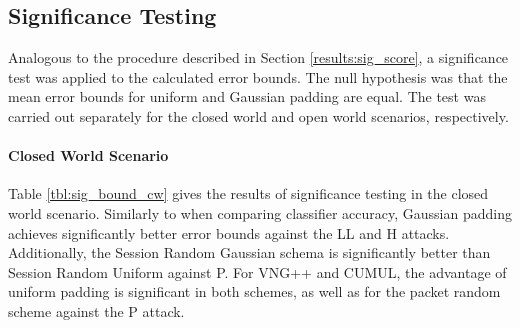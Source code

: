 \documentclass[
	ruledheaders=chapter,
	class=report,
	thesis={type=master, department=inf},
	accentcolor=1c,
	custommargins=true,
	marginpar=false,
	parskip=half-,
	fontsize=11pt,
]{tudapub}
\begin{document}
	\subsection{Significance Testing}
	
	Analogous to the procedure described in Section \ref{results:sig_score}, a significance test was applied to the calculated error bounds. The null hypothesis was that the mean error bounds for uniform and Gaussian padding are equal. The test was carried out separately for the closed world and open world scenarios, respectively.
	
	\paragraph{Closed World Scenario} Table \ref{tbl:sig_bound_cw} gives the results of significance testing in the closed world scenario. Similarly to when comparing classifier accuracy, Gaussian padding achieves significantly better error bounds against the LL and H attacks. Additionally, the Session Random Gaussian schema is significantly better than Session Random Uniform against P. For VNG++ and CUMUL, the advantage of uniform padding is significant in both schemes, as well as for the packet random scheme against the P attack.
	
\end{document}
